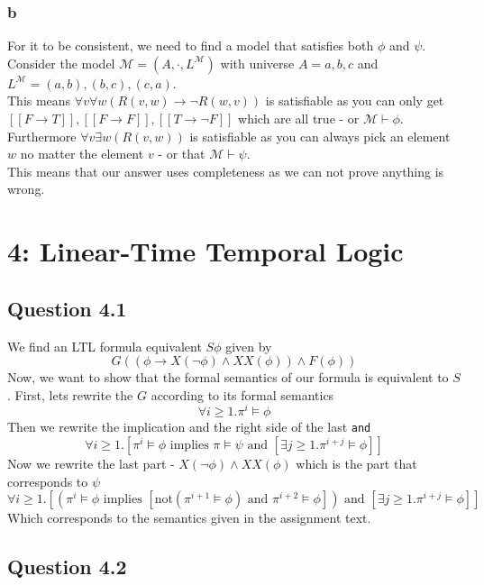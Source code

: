 \documentclass[12pt]{article}
\begin{document}
\subsubsection*{b}
For it to be consistent, we need to find a model that satisfies both $\phi$ and $\psi$. \\
Consider the model $\mathcal{M}=(A,\cdot,{L^{\mathcal{M}}})$ with universe $A={a,b,c}$ and $L^{\mathcal{M}}={(a,b),(b,c),(c,a)}$.\\
This means $\forall v\forall w(R(v,w)\to \neg R(w,v))$ is satisfiable as you can only get $[[F\to T]],[[F\to F]], [[T\to\neg F]]$ which are all true - or $\mathcal{M}\vdash \phi$.\\
Furthermore $\forall v\exists w(R(v,w))$ is satisfiable as you can always pick an element $w$ no matter the element $v$ - or that $\mathcal{M}\vdash \psi$.\\
This means that our answer uses completeness as we can not prove anything is wrong.


\section*{4: Linear-Time Temporal Logic}
\subsection*{Question 4.1}
We find an LTL formula equivalent $S\phi$ given by
$$G((\phi\to X(\neg\phi)\land XX(\phi))\land F(\phi))$$
Now, we want to show that the formal semantics of our formula is equivalent to $S$.
First, lets rewrite the $G$ according to its formal semantics
$$\forall i\geq 1.\pi^i\models\phi$$
Then we rewrite the implication and the right side of the last \texttt{and}
$$\forall i\geq 1.[\pi^i\models\phi \mbox{ implies } \pi\models\psi \mbox{ and } [\exists j\geq 1.\pi^{i+j}\models \phi]]$$
Now we rewrite the last part - $X(\neg \phi)\land XX(\phi)$ which is the part that corresponds to $\psi$
$$\forall i\geq 1.[(\pi^i\models\phi \mbox{ implies } [\mbox{not}(\pi^{i+1}\models \phi)\mbox{ and } \pi^{i+2}\models\phi]) \mbox{ and } [\exists j\geq 1.\pi^{i+j}\models \phi]]$$
Which corresponds to the semantics given in the assignment text.

\subsection*{Question 4.2}
\end{document}
